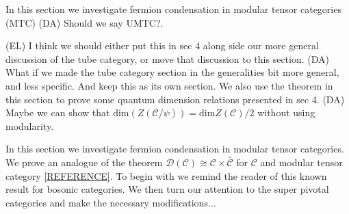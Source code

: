\documentclass[12pt,a4paper]{article}
\newcommand{\mcd}{\mathcal{D}}
\newcommand{\mcc}{\mathcal{C}}
\newcommand{\dave}[1]{{\color{ao(english)}\footnotesize{(DA) #1}}}
\newcommand{\ethan}[1]{{\color{amethyst}\footnotesize{(EL) #1}}}
\begin{document}
In this section we investigate fermion condensation in modular tensor categories (MTC) \dave{Should we say UMTC?}. 

\ethan{I think we should either put this in sec 4 along side our more general discussion of the tube category, or move that discussion to this section.
\dave{What if we made the tube category section in the generalities bit more general, and less specific. 
And keep this as its own section.}
 We also use the theorem in this section to prove some quantum dimension relations presented in sec 4.
 \dave{Maybe we can show that $\text{dim}(Z(\mcc/\psi)) = \text{dim}Z(\mcc)/2$ without using modularity.}}

In this section we investigate fermion condensation in modular tensor categories. 
We prove an analogue of the theorem $\mcd(\mcc) \cong \mcc \times \bar{\mcc}$ for $\mcc$ and modular tensor category \ref{REFERENCE}. 
To begin with we remind the reader of this known result for bosonic categories.
We then turn our attention to the super pivotal categories and make the necessary modifications...
\end{document}

